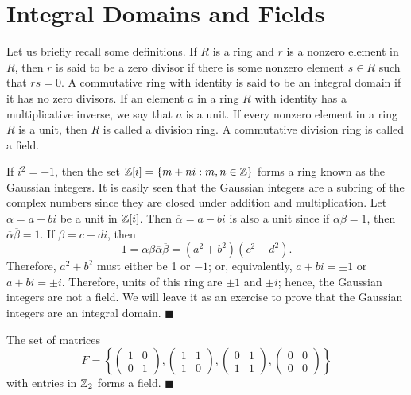  
 
\section{Integral Domains and Fields}
 
 
Let us briefly recall some definitions. If $R$ is a ring and $r$ is a
nonzero element in $R$, then $r$ is said to  be a {\bfi zero divisor\/}
if there is some nonzero element $s \in R$ such that $rs = 0$. A
commutative ring with identity is said to be an {\bfi integral
domain\/} if it has no zero divisors.  If an element $a$ in a ring $R$
with identity has a multiplicative inverse, we say that $a$ is a {\bfi
unit}. If every nonzero element in a ring $R$ is a unit, then $R$ is
called a {\bfi division ring}.  A commutative division ring is called
a {\bfi field}. 
 
 
\vspace{2ex}
 
 
If $i^2 = -1$, then the set ${\Bbb Z}[ i ] = \{ m + ni : m, n \in
{\Bbb Z} \}$ forms a ring known as the {\bfi Gaussian
integers}\label{gaussianintegers}. It is
easily seen that the Gaussian integers are a subring of the complex
numbers since they are closed under addition and multiplication. Let
$\alpha = a + bi$ be a unit in ${\Bbb Z}[ i ]$. Then
$\overline{\alpha} = a - bi$ is also a unit since if $\alpha \beta =
1$, then $\overline{\alpha} \overline{\beta} = 1$. If $\beta = c +
di$, then   
\[
1 = \alpha \beta \overline{\alpha} \overline{\beta} = (a^2 +
b^2 )(c^2
+ d^2).
\]
Therefore, $a^2 + b^2$ must either be 1 or $-1$; or, equivalently, $a
+ bi = \pm 1$ or $a+ bi = \pm i$.  Therefore, units of this ring are
$\pm 1$ and $\pm i$; hence, the Gaussian integers are not a field. We
will leave it as an exercise to prove that the Gaussian integers are
an integral domain. 
\hspace{\fill} $\blacksquare$
 
 
\vspace{2ex}
 
 
The set of matrices
\[
F
=
\left\{
\left(
\begin{array}{cc}
1 & 0 \\
0 & 1
\end{array}
\right),
\left(
\begin{array}{cc}
1 & 1 \\
1 & 0
\end{array}
\right),
\left(
\begin{array}{cc}
0 & 1 \\
1 & 1
\end{array}
\right),
\left(
\begin{array}{cc}
0 & 0 \\
0 & 0
\end{array}
\right)
\right\}
\]
with entries in ${\Bbb Z}_2$ forms a field.
\hspace{\fill} $\blacksquare$
 
